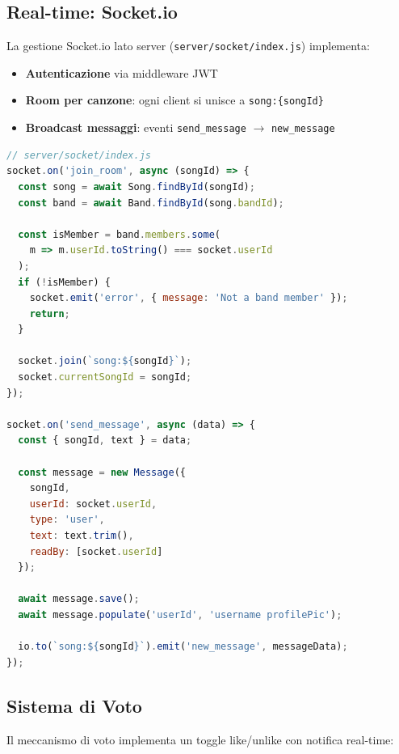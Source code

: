 \documentclass{report}
\begin{document}
\subsection{Real-time: Socket.io}

La gestione Socket.io lato server (\texttt{server/socket/index.js}) implementa:
\begin{itemize}
    \item \textbf{Autenticazione} via middleware JWT
    \item \textbf{Room per canzone}: ogni client si unisce a \texttt{song:\{songId\}}
    \item \textbf{Broadcast messaggi}: eventi \texttt{send\_message} $\rightarrow$ \texttt{new\_message}
\end{itemize}

\begin{lstlisting}[language=JavaScript, caption={Gestione eventi Socket.io}]
// server/socket/index.js
socket.on('join_room', async (songId) => {
  const song = await Song.findById(songId);
  const band = await Band.findById(song.bandId);

  const isMember = band.members.some(
    m => m.userId.toString() === socket.userId
  );
  if (!isMember) {
    socket.emit('error', { message: 'Not a band member' });
    return;
  }

  socket.join(`song:${songId}`);
  socket.currentSongId = songId;
});

socket.on('send_message', async (data) => {
  const { songId, text } = data;

  const message = new Message({
    songId,
    userId: socket.userId,
    type: 'user',
    text: text.trim(),
    readBy: [socket.userId]
  });

  await message.save();
  await message.populate('userId', 'username profilePic');

  io.to(`song:${songId}`).emit('new_message', messageData);
});
\end{lstlisting}

\subsection{Sistema di Voto}

Il meccanismo di voto implementa un toggle like/unlike con notifica real-time:
\end{document}
